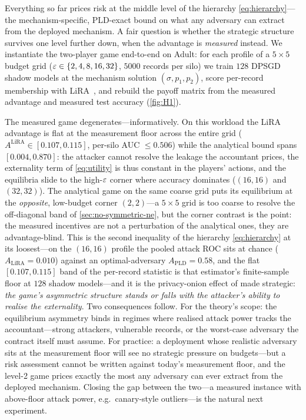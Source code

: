 Everything so far prices risk at the middle level of the hierarchy
\eqref{eq:hierarchy}---the mechanism-specific, \ac{PLD}-exact bound on
what any adversary can extract from the deployed mechanism. A fair question is whether
the strategic structure survives one level further down, when the
advantage is \emph{measured} instead. We instantiate the two-player
game end-to-end on Adult: for each profile of a $5 \times 5$ budget
grid ($\varepsilon \in \{2,4,8,16,32\}$, $5000$ records per silo) we train
$128$ \ac{DPSGD} shadow models at the mechanism solution $(\sigma, p_1,
p_2)$, score per-record membership with
\ac{LiRA}~\cite{carlini2022membership}, and rebuild the payoff matrix from
the measured advantage and measured test accuracy
(\cref{fig:H1}).

The measured game degenerates---informatively. On this workload the
\ac{LiRA} advantage is flat at the measurement floor across the entire
grid ($A^{\mathrm{LiRA}} \in [0.107, 0.115]$, per-silo AUC $\le
0.506$) while the analytical bound spans $[0.004, 0.870]$: the
attacker cannot resolve the leakage the accountant prices, the
externality term of \eqref{eq:utility} is thus constant in the
players' actions, and the equilibria slide to the high-$\varepsilon$ corner
where accuracy dominates ($(16,16)$ and $(32,32)$). The analytical
game on the same coarse grid puts its equilibrium at the
\emph{opposite}, low-budget corner $(2,2)$---a $5{\times}5$ grid is
too coarse to resolve the off-diagonal band of \cref{sec:no-symmetric-ne}, but the
corner contrast is the point: the measured incentives are not a
perturbation of the analytical ones, they are advantage-blind. This
is the second inequality of the hierarchy \eqref{eq:hierarchy} at its
loosest---on the $(16,16)$ profile the pooled attack ROC sits at
chance ($A_{\mathrm{LiRA}} = 0.010$) against an optimal-adversary
$A_{\mathrm{PLD}} = 0.58$, and the flat
$[0.107, 0.115]$ band of the per-record statistic is that
estimator's finite-sample floor at $128$ shadow models---and it is
the privacy-onion effect of \citet{carlini2022privacy} made
strategic: \emph{the game's asymmetric structure stands or falls with
the attacker's ability to realise the externality}. Two
consequences follow. For the theory's scope: the equilibrium
asymmetry binds in regimes where realised attack power tracks the
accountant---strong attackers, vulnerable records, or the worst-case
adversary the contract itself must assume. For practice: a deployment
whose realistic adversary sits at the measurement floor will see no
strategic pressure on budgets---but a risk assessment cannot be
written against today's measurement floor, and the level-2 game
prices exactly the most any adversary can ever extract from the
deployed mechanism. Closing the gap between the two---a
measured instance with above-floor attack power, e.g.\ canary-style
outliers---is the natural next experiment.


